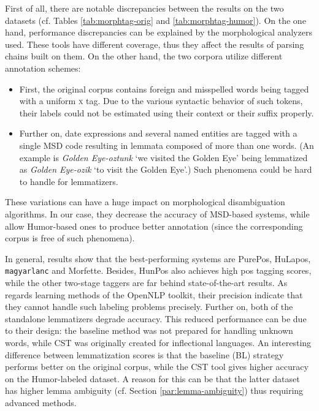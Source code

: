 First of all, there are notable discrepancies between the results on the two datasets (cf. Tables \ref{tab:morphtag-orig} and \ref{tab:morphtag-humor}). 
On the one hand, performance discrepancies can be explained by the morphological analyzers used.
These tools have different coverage, thus they affect the results of parsing chains built on them.
On the other hand, the two corpora utilize different annotation schemes:
\begin{itemize}
  \item First, the original corpus contains foreign and misspelled words being tagged with a uniform \textsc{x} tag. 
  Due to the various syntactic behavior of such tokens, their labels could not be estimated using their context or their suffix properly.
  \item Further on, date expressions and several named entities are tagged with a single MSD code resulting in lemmata composed of more than one words. (An example is \emph{Golden Eye-oztunk} `we visited the Golden Eye’ being lemmatized as \emph{Golden Eye-ozik} `to visit the Golden Eye’.) 
  Such phenomena could be hard to handle for lemmatizers.
\end{itemize}
These variations can have a huge impact on morphological disambiguation algorithms.
In our case, they decrease the accuracy of MSD-based systems, while allow Humor-based ones to produce better annotation  (since the corresponding corpus is free of such phenomena).

In general, results show that the best-performing systems are PurePos, HuLapos, \texttt{magyarlanc} and Morfette.
Besides, HunPos also achieves high \acrshort{pos} tagging scores, while the other two-stage taggers are far behind state-of-the-art results. 
As regards learning methods of the OpenNLP toolkit, their precision indicate that they cannot handle such labeling problems precisely.
Further on, both of the standalone lemmatizers degrade accuracy. 
This reduced performance can be due to their design: the baseline method was not prepared for handling unknown words, while CST was originally created for inflectional languages. 
An interesting difference between lemmatization scores is that the baseline (BL) strategy performs better on the original corpus, while the CST tool gives higher accuracy on the Humor-labeled dataset. A reason for this can be that the latter dataset has higher lemma ambiguity (cf. Section \ref{par:lemma-ambiguity}) thus requiring advanced methods.

